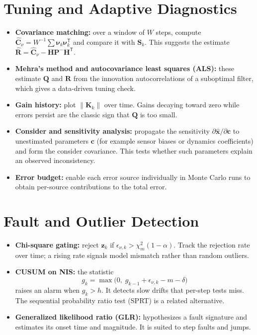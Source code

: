 \documentclass[11pt]{article}
\newcommand{\xhat}{\hat{\bm{x}}}
\newcommand{\nuv}{\bm{\nu}}
\newcommand{\Pm}{\bm{P}}
\newcommand{\Sm}{\bm{S}}
\newcommand{\Hm}{\bm{H}}
\newcommand{\Km}{\bm{K}}
\newcommand{\Qm}{\bm{Q}}
\newcommand{\Rm}{\bm{R}}
\newcommand{\T}{^{\mathsf{T}}}
\newcommand{\chisq}[1]{\chi^2_{#1}}
\begin{document}
\section{Tuning and Adaptive Diagnostics}
\label{sec:tuning}
\begin{itemize}
  \item \textbf{Covariance matching:} over a window of $W$ steps, compute
        $\hat{\bm{C}}_\nu = W^{-1}\sum \nuv_k\nuv_k\T$ and compare it with $\Sm_k$.
        This suggests the estimate $\hat{\Rm} = \hat{\bm{C}}_\nu - \Hm\Pm^-\Hm\T$.
  \item \textbf{Mehra's method and autocovariance least squares (ALS):} these estimate
        $\Qm$ and $\Rm$ from the innovation autocorrelations of a suboptimal filter,
        which gives a data-driven tuning check.
  \item \textbf{Gain history:} plot $\|\Km_k\|$ over time. Gains decaying toward zero
        while errors persist are the classic sign that $\Qm$ is too small.
  \item \textbf{Consider and sensitivity analysis:} propagate the sensitivity
        $\partial\xhat/\partial\bm{c}$ to unestimated parameters $\bm{c}$ (for example
        sensor biases or dynamics coefficients) and form the consider covariance.
        This tests whether such parameters explain an observed inconsistency.
  \item \textbf{Error budget:} enable each error source individually in Monte Carlo runs
        to obtain per-source contributions to the total error.
\end{itemize}

\section{Fault and Outlier Detection}
\label{sec:fault}
\begin{itemize}
  \item \textbf{Chi-square gating:} reject $\bm{z}_k$ if
        $\epsilon_{\nu,k} > \chisq{m}(1-\alpha)$. Track the rejection rate over time;
        a rising rate signals model mismatch rather than random outliers.
  \item \textbf{CUSUM on NIS:} the statistic
        \begin{equation}
          g_k = \max\!\big(0,\; g_{k-1} + \epsilon_{\nu,k} - m - \delta\big)
        \end{equation}
        raises an alarm when $g_k > h$. It detects slow drifts that per-step tests miss.
        The sequential probability ratio test (SPRT) is a related alternative.
  \item \textbf{Generalized likelihood ratio (GLR):} hypothesizes a fault signature and
        estimates its onset time and magnitude. It is suited to step faults and jumps.
\end{itemize}
\end{document}

